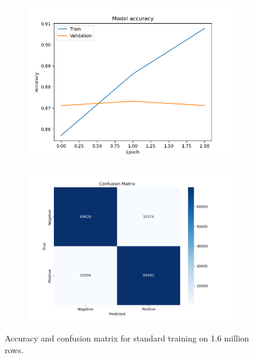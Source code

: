     \begin{figure}[h]
        \centering
        \begin{subfigure}{0.49\textwidth}
            \centering
            \includegraphics[width=\textwidth]{figures/standard-train-1600000-accuracy.png}
        \end{subfigure}
        \begin{subfigure}{0.49\textwidth}
            \centering
            \includegraphics[width=\textwidth]{figures/standard-train-1600000-confusion.png}
        \end{subfigure}
        \caption{Accuracy and confusion matrix for standard training on 1.6 million rows.}
    \end{figure}
    \FloatBarrier

